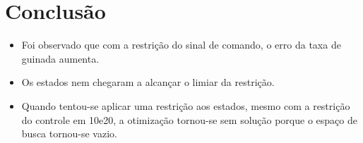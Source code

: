 \documentclass{beamer}
\begin{document}
   \section{Conclusão}%
  \begin{frame}%
  	\begin{itemize}
  	\item Foi observado que com a restrição do sinal de comando, o erro da taxa
  	de guinada aumenta.
  	\item Os estados nem chegaram a alcançar o limiar da restrição. 
  	\item Quando tentou-se aplicar uma restrição aos estados, mesmo com a
  	restrição do controle em 10e20, a otimização tornou-se sem solução porque o
  	espaço de busca tornou-se vazio. 	
  	\end{itemize}
   \end{frame}%
  
  \begin{frame}[allowframebreaks]

 


\end{frame}
  
  
\end{document}
